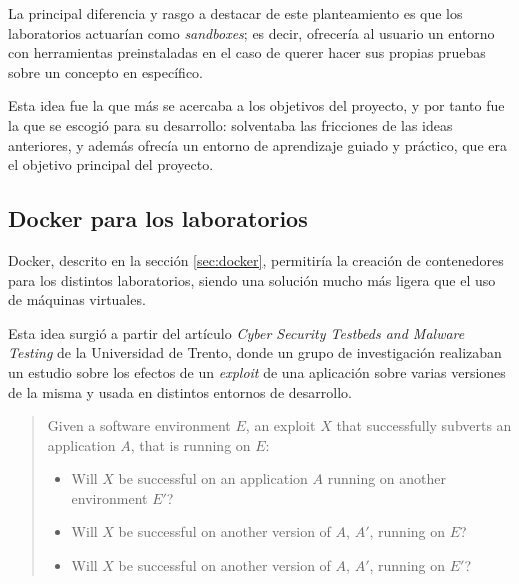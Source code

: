             La principal diferencia y rasgo a destacar de este planteamiento es que los laboratorios actuarían como \textit{sandboxes}; es decir, ofrecería al usuario un entorno con herramientas preinstaladas en el caso de querer hacer sus propias pruebas sobre un concepto en específico.

            Esta idea fue la que más se acercaba a los objetivos del proyecto, y por tanto fue la que se escogió para su desarrollo: solventaba las fricciones de las ideas anteriores, y además ofrecía un entorno de aprendizaje guiado y práctico, que era el objetivo principal del proyecto.

        \subsection{Docker para los laboratorios}

            Docker, descrito en la sección \ref{sec:docker}, permitiría la creación de contenedores para los distintos laboratorios, siendo una solución mucho más ligera que el uso de máquinas virtuales.
                
            Esta idea surgió a partir del artículo \textit{Cyber Security Testbeds and Malware Testing} \cite{securitylab-malware-analysis} de la Universidad de Trento, donde un grupo de investigación realizaban un estudio sobre los efectos de un \textit{exploit} de una aplicación sobre varias versiones de la misma y usada en distintos entornos de desarrollo.

            \begin{quotation}
                
                Given a software environment $E$, an exploit $X$ that successfully subverts an application $A$, that is running on $E$:
                
                \begin{itemize}
                    \item Will $X$ be successful on an application $A$ running on another environment $E'$?
                    \item Will $X$ be successful on another version of $A$, $A'$, running on $E$?
                    \item Will $X$ be successful on another version of $A$, $A'$, running on $E'$?
                \end{itemize}

            \end{quotation}

